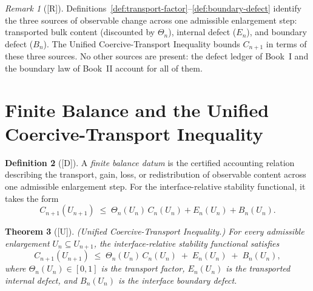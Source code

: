 \documentclass[12pt,oneside]{amsbook}
\theoremstyle{plain}
\newtheorem{theorem}{Theorem}[section]
\theoremstyle{definition}
\newtheorem{definition}[theorem]{Definition}
\theoremstyle{remark}
\newtheorem{remark}[theorem]{Remark}
\newcommand{\status}[1]{\textup{[#1]}}
\begin{document}
\begin{remark}[\status{R}]\label{rmk:three-sources}
Definitions~\ref{def:transport-factor}--\ref{def:boundary-defect}
identify the three sources of observable change across one admissible
enlargement step: transported bulk content (discounted by $\Theta_n$),
internal defect ($E_n$), and boundary defect ($B_n$).  The
Unified Coercive-Transport Inequality bounds $C_{n+1}$ in terms of
these three sources.  No other sources are present: the defect ledger
of Book~I and the boundary law of Book~II account for all of them.
\end{remark}

\section{Finite Balance and the Unified Coercive-Transport Inequality}

\begin{definition}[\status{D}]\label{def:finite-balance}
A \emph{finite balance datum} is the certified accounting relation
describing the transport, gain, loss, or redistribution of observable
content across one admissible enlargement step.  For the
interface-relative stability functional, it takes the form
\[
  C_{n+1}(U_{n+1}) \;\leq\;
  \Theta_n(U_n)\, C_n(U_n) + E_n(U_n) + B_n(U_n).
\]
\end{definition}

\begin{theorem}[\status{U}]\label{thm:unified-coercive}
\textup{(Unified Coercive-Transport Inequality.)}  For every admissible
enlargement $U_n \subseteq U_{n+1}$, the interface-relative stability
functional satisfies
\[
  C_{n+1}(U_{n+1}) \;\leq\;
  \Theta_n(U_n)\, C_n(U_n) \;+\; E_n(U_n) \;+\; B_n(U_n),
\]
where $\Theta_n(U_n) \in [0, 1]$ is the transport factor, $E_n(U_n)$
is the transported internal defect, and $B_n(U_n)$ is the interface
boundary defect.
\end{theorem}
\end{document}
